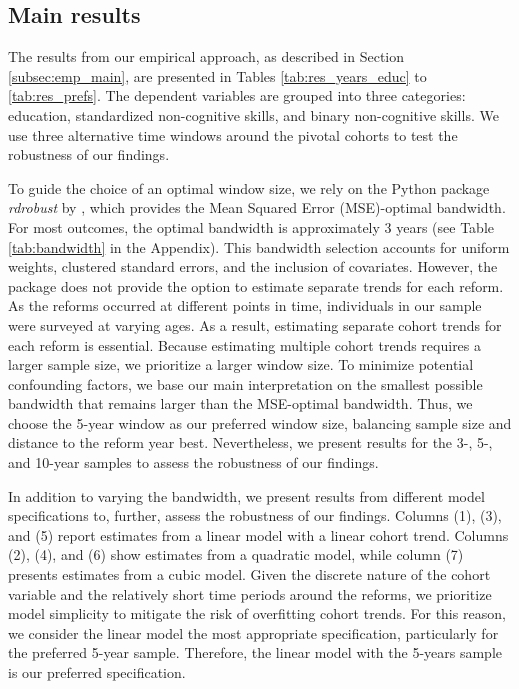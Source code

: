 \subsection{Main results} \label{subsec:res_main}

The results from our empirical approach, as described in Section \ref{subsec:emp_main}, are presented in Tables \ref{tab:res_years_educ} to \ref{tab:res_prefs}. The dependent variables are grouped into three categories: education, standardized non-cognitive skills, and binary non-cognitive skills. We use three alternative time windows around the pivotal cohorts to test the robustness of our findings.

To guide the choice of an optimal window size, we rely on the Python package \textit{rdrobust} by \citet{calonico_rdrobust_2023}, which provides the Mean Squared Error (MSE)-optimal bandwidth. For most outcomes, the optimal bandwidth is approximately 3 years (see Table \ref{tab:bandwidth} in the Appendix). This bandwidth selection accounts for uniform weights, clustered standard errors, and the inclusion of covariates. However, the package does not provide the option to estimate separate trends for each reform. As the reforms occurred at different points in time, individuals in our sample were surveyed at varying ages. As a result, estimating separate cohort trends for each reform is essential. Because estimating multiple cohort trends requires a larger sample size, we prioritize a larger window size. To minimize potential confounding factors, we base our main interpretation on the smallest possible bandwidth that remains larger than the MSE-optimal bandwidth. Thus, we choose the 5-year window as our preferred window size, balancing sample size and distance to the reform year best. Nevertheless, we present results for the 3-, 5-, and 10-year samples to assess the robustness of our findings.

In addition to varying the bandwidth, we present results from different model specifications to, further, assess the robustness of our findings. Columns (1), (3), and (5) report estimates from a linear model with a linear cohort trend. Columns (2), (4), and (6) show estimates from a quadratic model, while column (7) presents estimates from a cubic model. Given the discrete nature of the cohort variable and the relatively short time periods around the reforms, we prioritize model simplicity to mitigate the risk of overfitting cohort trends. For this reason, we consider the linear model the most appropriate specification, particularly for the preferred 5-year sample. Therefore, the linear model with the 5-years sample is our preferred specification.



